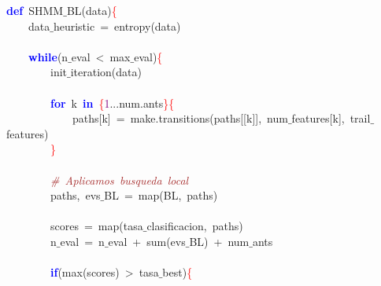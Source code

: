\noindent
\mbox{}\textbf{\textcolor{Blue}{def}}\ SHMM$\_$BL\textcolor{BrickRed}{(}data\textcolor{BrickRed}{)}\textcolor{Red}{\{} \\
\mbox{}\ \ \ \ data$\_$heuristic\ \textcolor{BrickRed}{=}\ entropy\textcolor{BrickRed}{(}data\textcolor{BrickRed}{)} \\
\mbox{} \\
\mbox{}\ \ \ \ \textbf{\textcolor{Blue}{while}}\textcolor{BrickRed}{(}n$\_$eval\ \textcolor{BrickRed}{\textless{}}\ max$\_$eval\textcolor{BrickRed}{)}\textcolor{Red}{\{} \\
\mbox{}\ \ \ \ \ \ \ \ init$\_$iteration\textcolor{BrickRed}{(}data\textcolor{BrickRed}{)} \\
\mbox{} \\
\mbox{}\ \ \ \ \ \ \ \ \textbf{\textcolor{Blue}{for}}\ k\ \textbf{\textcolor{Blue}{in}}\ \textcolor{Red}{\{}\textcolor{Purple}{1}\textcolor{BrickRed}{...}num\textcolor{BrickRed}{.}ants\textcolor{Red}{\}\{} \\
\mbox{}\ \ \ \ \ \ \ \ \ \ \ \ paths\textcolor{BrickRed}{[}k\textcolor{BrickRed}{]}\ \textcolor{BrickRed}{=}\ make\textcolor{BrickRed}{.}transitions\textcolor{BrickRed}{(}paths\textcolor{BrickRed}{[[}k\textcolor{BrickRed}{]],}\ num$\_$features\textcolor{BrickRed}{[}k\textcolor{BrickRed}{],}\ trail$\_$features\textcolor{BrickRed}{)} \\
\mbox{}\ \ \ \ \ \ \ \ \textcolor{Red}{\}} \\
\mbox{} \\
\mbox{}\ \ \ \ \ \ \ \ \textit{\textcolor{Brown}{\#\ Aplicamos\ busqueda\ local}} \\
\mbox{}\ \ \ \ \ \ \ \ paths\textcolor{BrickRed}{,}\ evs$\_$BL\ \textcolor{BrickRed}{=}\ map\textcolor{BrickRed}{(}BL\textcolor{BrickRed}{,}\ paths\textcolor{BrickRed}{)} \\
\mbox{} \\
\mbox{}\ \ \ \ \ \ \ \ scores\ \textcolor{BrickRed}{=}\ map\textcolor{BrickRed}{(}tasa$\_$clasificacion\textcolor{BrickRed}{,}\ paths\textcolor{BrickRed}{)} \\
\mbox{}\ \ \ \ \ \ \ \ n$\_$eval\ \textcolor{BrickRed}{=}\ n$\_$eval\ \textcolor{BrickRed}{+}\ sum\textcolor{BrickRed}{(}evs$\_$BL\textcolor{BrickRed}{)}\ \textcolor{BrickRed}{+}\ num$\_$ants \\
\mbox{} \\
\mbox{}\ \ \ \ \ \ \ \ \textbf{\textcolor{Blue}{if}}\textcolor{BrickRed}{(}max\textcolor{BrickRed}{(}scores\textcolor{BrickRed}{)}\ \textcolor{BrickRed}{\textgreater{}}\ tasa$\_$best\textcolor{BrickRed}{)}\textcolor{Red}{\{} \\
